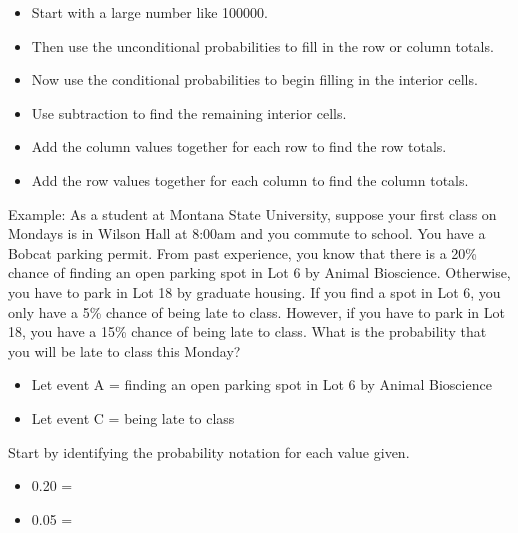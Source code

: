 \documentclass[
]{report}
\providecommand{\tightlist}{%
  \setlength{\itemsep}{0pt}\setlength{\parskip}{0pt}}
\begin{document}
\begin{itemize}
\item
  Start with a large number like 100000.
\item
  Then use the unconditional probabilities to fill in the row or column totals.
\item
  Now use the conditional probabilities to begin filling in the interior cells.
\item
  Use subtraction to find the remaining interior cells.
\item
  Add the column values together for each row to find the row totals.
\item
  Add the row values together for each column to find the column totals.
\end{itemize}

Example: As a student at Montana State University, suppose your first class on Mondays is in Wilson Hall at 8:00am and you commute to school. You have a Bobcat parking permit. From past experience, you know that there is a 20\% chance of finding an open parking spot in Lot 6 by Animal Bioscience. Otherwise, you have to park in Lot 18 by graduate housing. If you find a spot in Lot 6, you only have a 5\% chance of being late to class. However, if you have to park in Lot 18, you have a 15\% chance of being late to class. What is the probability that you will be late to class this Monday?

\begin{itemize}
\tightlist
\item
  Let event A = finding an open parking spot in Lot 6 by Animal Bioscience
\item
  Let event C = being late to class
\end{itemize}


Start by identifying the probability notation for each value given.

\begin{itemize}
\tightlist
\item
  0.20 =
\end{itemize}

\vspace{0.1in}

\begin{itemize}
\tightlist
\item
  0.05 =
\end{itemize}

\vspace{0.1in}
\end{document}
